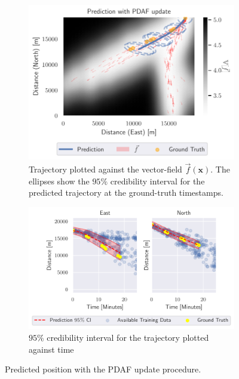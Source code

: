 \begin{figure}
    \centering
    \begin{subfigure}{\textwidth}
        \centering
        \includegraphics[width=\textwidth]{figures/dyngp/gp_ekf_with_pdaf.pdf}
        \caption{Trajectory plotted against the vector-field $\vec{f}(\boldsymbol{x})$. The ellipses show the $95\%$ credibility interval for the predicted trajectory at the ground-truth timestamps.}
    \end{subfigure}
    \begin{subfigure}{\textwidth}
        \centering
        \includegraphics[width=\textwidth]{figures/dyngp/gp_ekf_with_pdaf_state.pdf}
        \caption{$95\%$ credibility interval for the trajectory plotted against time}
    \end{subfigure}
    \caption{Predicted position with the PDAF update procedure.}
    \label{fig:gp_ekf_with_pdaf}
\end{figure}


